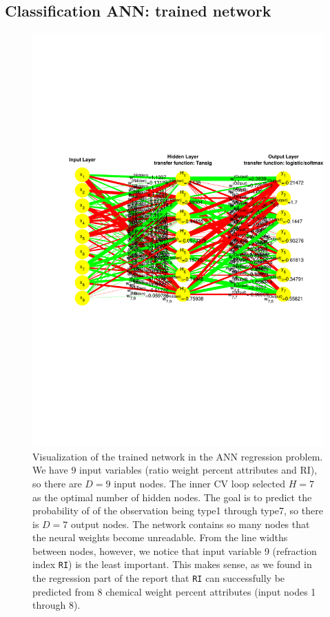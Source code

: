 \subsection{Classification ANN: trained network}

\begin{figure}[H]
    \centering
    \includegraphics[width=1.0\textwidth]{fig/classification/ANN_class_trained_network.pdf}
    \caption{Visualization of the trained network in the ANN regression problem. We have 9 input variables (ratio weight percent attributes and RI), so there are $D=9$ input nodes. The inner CV loop selected $H=7$ as the optimal number of hidden nodes. The goal is to predict the probability of of the observation being type1 through type7, so there is $D = 7$ output nodes. The network contains so many nodes that the neural weights become unreadable. From the line widths between nodes, however, we notice that input variable 9 (refraction index \texttt{RI}) is the least important. This makes sense, as we found in the regression part of the report that \texttt{RI} can successfully be predicted from 8 chemical weight percent attributes (input nodes 1 through 8). }
\end{figure}